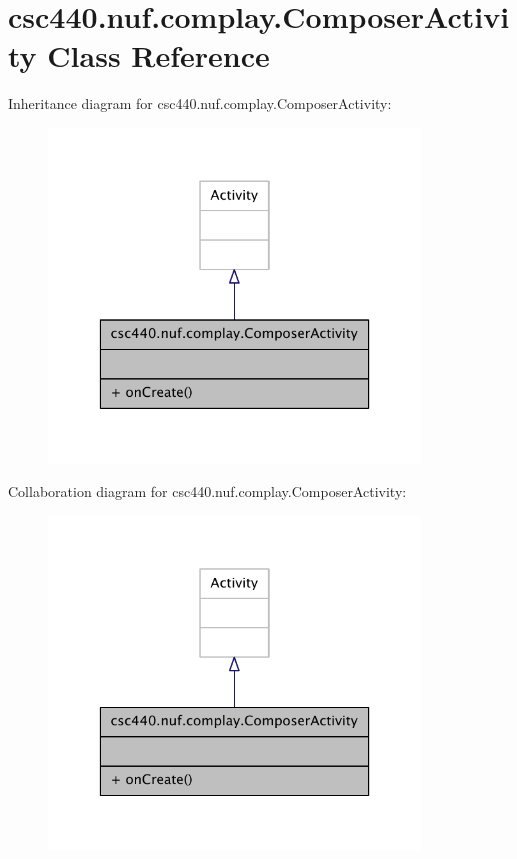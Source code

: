 \hypertarget{classcsc440_1_1nuf_1_1complay_1_1_composer_activity}{\section{csc440.\-nuf.\-complay.\-Composer\-Activity Class Reference}
\label{classcsc440_1_1nuf_1_1complay_1_1_composer_activity}
}


Inheritance diagram for csc440.\-nuf.\-complay.\-Composer\-Activity\-:
\nopagebreak
\begin{figure}[H]
\begin{center}
\leavevmode
\includegraphics[width=280pt]{classcsc440_1_1nuf_1_1complay_1_1_composer_activity__inherit__graph}
\end{center}
\end{figure}


Collaboration diagram for csc440.\-nuf.\-complay.\-Composer\-Activity\-:
\nopagebreak
\begin{figure}[H]
\begin{center}
\leavevmode
\includegraphics[width=280pt]{classcsc440_1_1nuf_1_1complay_1_1_composer_activity__coll__graph}
\end{center}
\end{figure}
